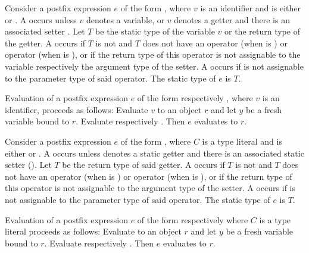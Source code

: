 \documentclass[makeidx]{article}
\begin{document}
{\LMHash{}%
Consider a postfix expression $e$ of the form ,
where $v$ is an identifier and \op{} is either \lit{++} or \lit{-{}-}.
A  occurs unless $v$ denotes a variable,
or $v$ denotes a getter and there is an associated setter .
Let $T$ be the static type of the variable $v$ or the return type of the getter.
A  occurs if $T$ is not \DYNAMIC{}
and $T$ does not have an operator \lit{+} (when \op{} is \lit{++})
or operator \lit{-} (when \op{} is \lit{-{}-}),
or if the return type of this operator is not assignable to
the variable respectively the argument type of the setter.
A  occurs if  is not assignable to
the parameter type of said operator.
The static type of $e$ is $T$.

\LMHash{}%
Evaluation of a postfix expression $e$
of the form  respectively ,
where $v$ is an identifier, proceeds as follows:
Evaluate $v$ to an object $r$ and let $y$ be a fresh variable bound to $r$.
Evaluate  respectively .
Then $e$ evaluates to $r$.

\EndCase

\LMHash{}%
Consider a postfix expression $e$ of the form ,
where $C$ is a type literal and \op{} is either \lit{++} or \lit{-{}-}.
A  occurs
unless  denotes a static getter
and there is an associated static setter 
().
Let $T$ be the return type of said getter.
A  occurs if $T$ is not \DYNAMIC{}
and $T$ does not have an operator \lit{+} (when \op{} is \lit{++})
or operator \lit{-} (when \op{} is \lit{-{}-}),
or if the return type of this operator is not assignable to
the argument type of the setter.
A  occurs if  is not assignable to
the parameter type of said operator.
The static type of $e$ is $T$.

\LMHash{}%
Evaluation of a postfix expression $e$
of the form  respectively 
where $C$ is a type literal proceeds as follows:
Evaluate  to an object $r$
and let $y$ be a fresh variable bound to $r$.
Evaluate  respectively .
Then $e$ evaluates to $r$.
\EndCase

}
\end{document}
